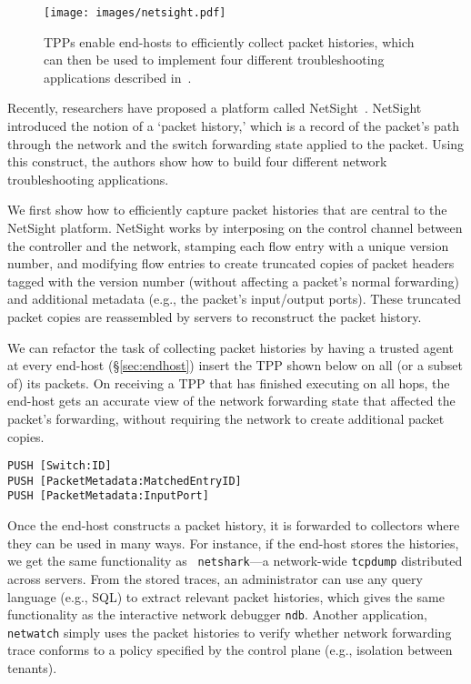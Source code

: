 \begin{figure}[t]
\centering
\texttt{[image: images/netsight.pdf]}
\caption{TPPs enable end-hosts to efficiently collect
  packet histories, which can then be used to implement four
  different troubleshooting applications described in~\cite{netsight}.}\vspace{-1em}
\label{fig:netsight}
\end{figure}

Recently, researchers have proposed a platform called
NetSight~\cite{netsight}.  NetSight introduced the notion of a `packet
history,' which is a record of the packet's path through the
network and the switch forwarding state applied to the packet.  Using
this construct, the authors show how to build four different network
troubleshooting applications.

We first show how to efficiently capture packet histories that are
central to the NetSight platform.  NetSight works by interposing on
the control channel between the controller and the network, stamping
each flow entry with a unique version number, and modifying flow
entries to create truncated copies of packet headers tagged with the
version number (without affecting a packet's normal forwarding) and
additional metadata (e.g., the packet's input/output ports).  These
truncated packet copies are reassembled by servers to reconstruct the
packet history.

We can refactor the task of collecting packet histories by having a
trusted agent at every end-host (\S\ref{sec:endhost}) insert the TPP
shown below on all (or a subset of) its packets.  On receiving a TPP
that has finished executing on all hops, the end-host gets an accurate
view of the network forwarding state that affected the packet's
forwarding, without requiring the network to create additional packet
copies.
\begin{verbatim}
PUSH [Switch:ID]
PUSH [PacketMetadata:MatchedEntryID]
PUSH [PacketMetadata:InputPort]
\end{verbatim}

Once the end-host constructs a packet history, it is forwarded to
collectors where they can be used in many ways.  For instance, if the
end-host stores the histories, we get the same functionality as {\tt
netshark}---a network-wide {\tt tcpdump} distributed across servers.  From
the stored traces, an administrator can use any query language
(e.g., SQL) to extract relevant packet histories, which gives the same
functionality as the interactive network debugger {\tt ndb}.  Another
application, {\tt netwatch} simply uses the packet histories to verify
whether network forwarding trace conforms to a policy specified by the
control plane (e.g., isolation between tenants).

